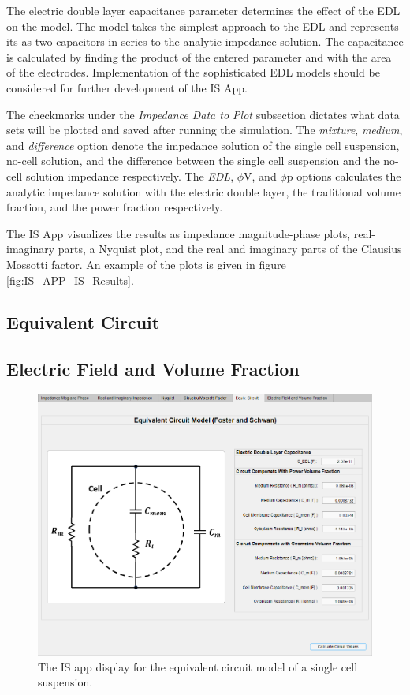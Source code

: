 \par The electric double layer capacitance parameter determines the effect of the EDL on the model. The model takes the simplest approach to the EDL and represents its as two capacitors in series to the analytic impedance solution. The capacitance is calculated by finding the product of the entered parameter and with the area of the electrodes. Implementation of the sophisticated EDL models should be considered for further development of the IS App. 

\par The checkmarks under the \textit{Impedance Data to Plot} subsection dictates what data sets will be plotted and saved after running the simulation. The \textit{mixture}, \textit{medium}, and \textit{difference} option denote the impedance solution of the single cell suspension, no-cell solution, and the difference between the single cell suspension and the no-cell solution impedance respectively. The \textit{EDL}, $\phi$V, and $\phi$p options calculates the analytic impedance solution with the electric double layer, the traditional volume fraction, and the power fraction respectively.

\par The IS App visualizes the results as impedance magnitude-phase plots, real-imaginary parts, a Nyquist plot, and the real and imaginary parts of the Clausius Mossotti factor. An example of the plots is given in figure \ref{fig:IS_APP_IS_Results}.

\subsection*{Equivalent Circuit}


\subsection*{Electric Field and Volume Fraction}


\begin{figure}
    \centering
    \includegraphics[width=\textwidth]{images/impedanceDisplayEquivCircuitV2.png}
    \caption{The IS app display for the equivalent circuit model of a single cell suspension.}
    \label{fig:is_app_equivalent_circuit}
\end{figure}


